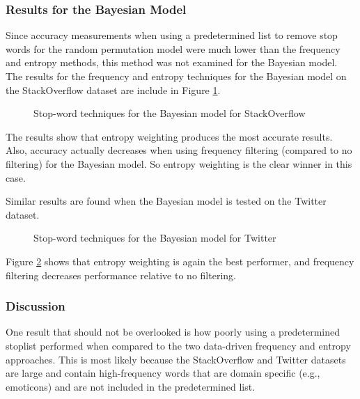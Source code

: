 \documentclass[man,floatsintext,donotrepeattitle]{apa6}
\begin{document}
\subsubsection{Results for the Bayesian Model}

Since accuracy measurements when using a predetermined list to remove stop words for the random permutation model were much lower than the frequency and entropy methods, this method was not examined for the Bayesian model.
The results for the frequency and entropy techniques for the Bayesian model on the StackOverflow dataset are include in Figure \ref{figContextStopBSO}.

\begin{figure}[!htbp]
  \caption{Stop-word techniques for the Bayesian model for StackOverflow}
  \label{figContextStopBSO}
\end{figure}

The results show that entropy weighting produces the most accurate results.
Also, accuracy actually decreases when using frequency filtering (compared to no filtering) for the Bayesian model.
So entropy weighting is the clear winner in this case.

Similar results are found when the Bayesian model is tested on the Twitter dataset.

\begin{figure}[!htbp]
  \caption{Stop-word techniques for the Bayesian model for Twitter}
  \label{figContextStopBT}
\end{figure}

Figure \ref{figContextStopBT} shows that entropy weighting is again the best performer, and frequency filtering decreases performance relative to no filtering.

\subsubsection{Discussion}

One result that should not be overlooked is how poorly using a predetermined stoplist performed when compared to the two data-driven frequency and entropy approaches.
This is most likely because the StackOverflow and Twitter datasets are large and contain high-frequency words that are domain specific (e.g., emoticons) and are not included in the predetermined list.
\end{document}
